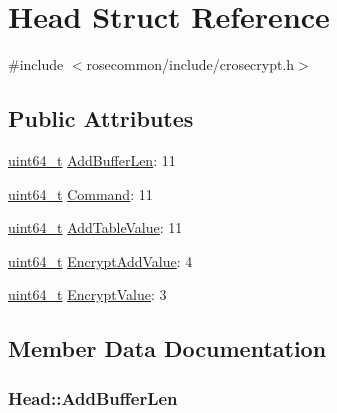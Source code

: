 \hypertarget{structHead}{}\section{Head Struct Reference}
\label{structHead}


{\ttfamily \#include $<$rosecommon/include/crosecrypt.\+h$>$}

\subsection*{Public Attributes}
\begin{DoxyCompactItemize}
\item 
\hyperlink{stdint_8h_aec6fcb673ff035718c238c8c9d544c47}{uint64\+\_\+t} \hyperlink{structHead_a56551c65c4134c00c1fa5e5a769396c5}{Add\+Buffer\+Len}\+: 11
\item 
\hyperlink{stdint_8h_aec6fcb673ff035718c238c8c9d544c47}{uint64\+\_\+t} \hyperlink{structHead_a31dd16236489258d0f5a93613c93e141}{Command}\+: 11
\item 
\hyperlink{stdint_8h_aec6fcb673ff035718c238c8c9d544c47}{uint64\+\_\+t} \hyperlink{structHead_a85ba2e132b3ba4efbdd50b8a1518bfe8}{Add\+Table\+Value}\+: 11
\item 
\hyperlink{stdint_8h_aec6fcb673ff035718c238c8c9d544c47}{uint64\+\_\+t} \hyperlink{structHead_a49e43eb40933ec9678070542af6957e2}{Encrypt\+Add\+Value}\+: 4
\item 
\hyperlink{stdint_8h_aec6fcb673ff035718c238c8c9d544c47}{uint64\+\_\+t} \hyperlink{structHead_a3e27ec06adee3efd9d152e9283a69a49}{Encrypt\+Value}\+: 3
\end{DoxyCompactItemize}


\subsection{Member Data Documentation}
\subsubsection[{\texorpdfstring{Add\+Buffer\+Len}{AddBufferLen}}]{ Head\+::\+Add\+Buffer\+Len}\hypertarget{structHead_a56551c65c4134c00c1fa5e5a769396c5}{}\label{structHead_a56551c65c4134c00c1fa5e5a769396c5}
